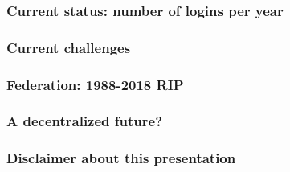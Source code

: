 \documentclass[aspectratio=169]{beamer}
\begin{document}
\begin{frame}
\frametitle{Current status: number of logins per year}
\end{frame}

\begin{frame}
\frametitle{Current challenges}
\end{frame}


\begin{frame}
\frametitle{Federation: 1988-2018 RIP}
\end{frame}

\begin{frame}
\frametitle{A decentralized future?}
\end{frame}

\begin{frame}
\frametitle{Disclaimer about this presentation}
\end{frame}

\subtitle{Thank you}
\frame[plain]{\titlepage}
\end{document}
